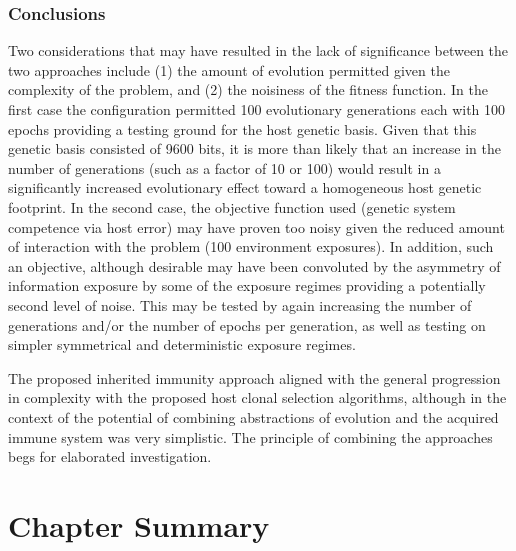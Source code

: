 \subsubsection{Conclusions}
Two considerations that may have resulted in the lack of significance between the two approaches include (1) the amount of evolution permitted given the complexity of the problem, and (2) the noisiness of the fitness function. In the first case the configuration permitted 100 evolutionary generations each with 100 epochs providing a testing ground for the host genetic basis. Given that this genetic basis consisted of 9600 bits, it is more than likely that an increase in the number of generations (such as a factor of 10 or 100) would result in a significantly increased evolutionary effect toward a homogeneous host genetic footprint. In the second case, the objective function used (genetic system competence via host error) may have proven too noisy given the reduced amount of interaction with the problem (100 environment exposures). In addition, such an objective, although desirable may have been convoluted by the asymmetry of information exposure by some of the exposure regimes providing a potentially second level of noise. This may be tested by again increasing the number of generations and/or the number of epochs per generation, as well as testing on simpler symmetrical and deterministic exposure regimes.

The proposed inherited immunity approach aligned with the general progression in complexity with the proposed host clonal selection algorithms, although in the context of the potential of combining abstractions of evolution and the acquired immune system was very simplistic. The principle of combining the approaches begs for elaborated investigation.

%
%
\section{Chapter Summary}
\label{sec:hosts:summary}

%
%
